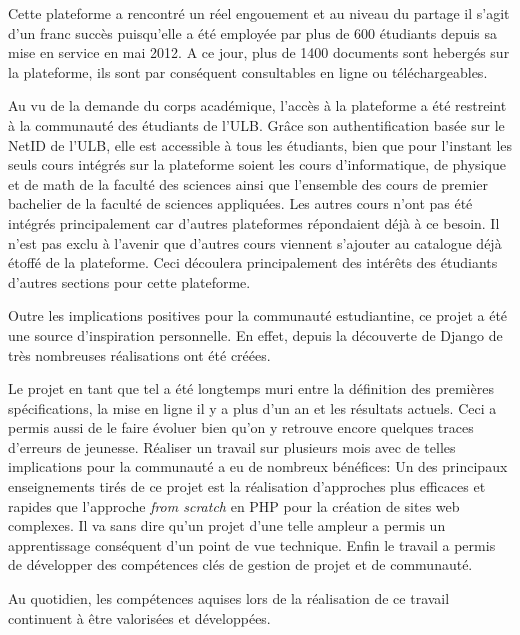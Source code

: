 \documentclass[a4paper,12pt]{article}
\begin{document}
Cette plateforme a rencontré un réel engouement et au niveau du partage il s'agit d'un franc succès 
puisqu'elle a été employée par plus de 600 étudiants depuis sa mise en service en mai 2012.
A ce jour, plus de 1400 documents sont hebergés sur la plateforme,
ils sont par conséquent consultables en ligne ou téléchargeables.

Au vu de la demande du corps académique, l'accès à la plateforme a été restreint à la communauté des étudiants 
de l'ULB. 
Grâce son authentification basée sur le NetID de l'ULB, elle est accessible à tous les étudiants,
bien que pour l'instant les seuls cours intégrés sur la plateforme soient
les cours d'informatique, de physique et de math de la faculté des sciences ainsi
que l'ensemble des cours de premier bachelier de la faculté de sciences appliquées.
Les autres cours n'ont pas été intégrés principalement car d'autres plateformes
répondaient déjà à ce besoin. Il n'est pas exclu à l'avenir que d'autres cours viennent s'ajouter au catalogue déjà 
étoffé de la plateforme. Ceci découlera principalement des intérêts des étudiants d'autres sections pour cette plateforme.

Outre les implications positives pour la communauté estudiantine, ce projet a été une source d'inspiration personnelle.
En effet, depuis la découverte de Django de très nombreuses réalisations ont été créées. 

Le projet en tant que tel a été longtemps muri entre la définition des premières spécifications, la mise en ligne il y a plus
d'un an et les résultats actuels. Ceci a permis aussi de le faire évoluer bien qu'on y retrouve encore quelques traces 
d'erreurs de jeunesse.
Réaliser un travail sur plusieurs mois avec de telles implications pour la communauté a eu de nombreux bénéfices:
Un des principaux enseignements tirés de ce projet est la réalisation d'approches plus efficaces et rapides que l'approche
\textit{from scratch} en PHP pour la création de sites web complexes.
Il va sans dire qu'un projet d'une telle ampleur a permis un apprentissage conséquent d'un point de vue technique.
Enfin le travail a permis de développer des compétences clés de gestion de projet et de communauté.

Au quotidien, les compétences aquises lors de la réalisation de ce travail continuent à être valorisées et développées.
\end{document}
